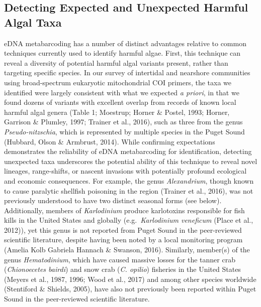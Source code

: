 \documentclass[
]{article}
\begin{document}
\hypertarget{detecting-expected-and-unexpected-harmful-algal-taxa}{%
\subsection{Detecting Expected and Unexpected Harmful Algal
Taxa}\label{detecting-expected-and-unexpected-harmful-algal-taxa}}

eDNA metabarcoding has a number of distinct advantages relative to
common techniques currently used to identify harmful algae. First, this
technique can reveal a diversity of potential harmful algal variants
present, rather than targeting specific species. In our survey of
intertidal and nearshore communities using broad-spectrum eukaryotic
mitochondrial COI primers, the taxa we identified were largely
consistent with what we expected \emph{a priori}, in that we found
dozens of variants with excellent overlap from records of known local
harmful algal genera (Table 1; Moestrup; Horner \& Postel, 1993; Horner,
Garrison \& Plumley, 1997; Trainer et al., 2016), such as three from the
genus \emph{Pseudo-nitzschia}, which is represented by multiple species
in the Puget Sound (Hubbard, Olson \& Armbrust, 2014). While confirming
expectations demonstrates the reliability of eDNA metabarcoding for
identification, detecting unexpected taxa underscores the potential
ability of this technique to reveal novel lineages, range-shifts, or
nascent invasions with potentially profound ecological and economic
consequences. For example, the genus \emph{Alexandrium}, though known to
cause paralytic shellfish poisoning in the region (Trainer et al.,
2016), was not previously understood to have two distinct seasonal forms
(see below). Additionally, members of \emph{Karlodinium} produce
karlotoxins responsible for fish kills in the United States and globally
(e.g.~\emph{Karlodinium veneficum} (Place et al., 2012)), yet this genus
is not reported from Puget Sound in the peer-reviewed scientific
literature, despite having been noted by a local monitoring program
(Amelia Kolb Gabriela Hannach \& Swanson, 2016). Similarly, member(s) of
the genus \emph{Hematodinium}, which have caused massive losses for the
tanner crab (\emph{Chionoecetes bairdi}) and snow crab (\emph{C.
opilio}) fisheries in the United States (Meyers et al., 1987, 1996; Wood
et al., 2017) and among other species worldwide (Stentiford \& Shields,
2005), have also not previously been reported within Puget Sound in the
peer-reviewed scientific literature.
\end{document}
